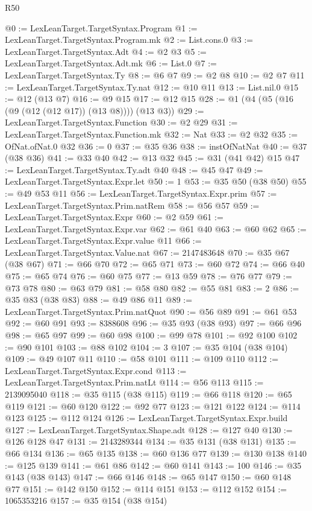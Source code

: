 \begin{lexlean}{R50}
\begin{coremodule}
@0 := LexLeanTarget.TargetSyntax.Program
@1 := LexLeanTarget.TargetSyntax.Program.mk
@2 := List.cons.{0}
@3 := LexLeanTarget.TargetSyntax.Adt
@4 := @2 @3
@5 := LexLeanTarget.TargetSyntax.Adt.mk
@6 := List.{0}
@7 := LexLeanTarget.TargetSyntax.Ty
@8 := @6 @7
@9 := @2 @8
@10 := @2 @7
@11 := LexLeanTarget.TargetSyntax.Ty.nat
@12 := @10 @11
@13 := List.nil.{0}
@15 := @12 (@13 @7)
@16 := @9 @15
@17 := @12 @15
@28 := @1 (@4 (@5 (@16 (@9 (@12 (@12 @17)) (@13 @8)))) (@13 @3))
@29 := LexLeanTarget.TargetSyntax.Function
@30 := @2 @29
@31 := LexLeanTarget.TargetSyntax.Function.mk
@32 := Nat
@33 := @2 @32
@35 := OfNat.ofNat.{0} @32
@36 := 0
@37 := @35 @36
@38 := instOfNatNat
@40 := @37 (@38 @36)
@41 := @33 @40
@42 := @13 @32
@45 := @31 (@41 @42) @15
@47 := LexLeanTarget.TargetSyntax.Ty.adt @40
@48 := @45 @47
@49 := LexLeanTarget.TargetSyntax.Expr.let
@50 := 1
@53 := @35 @50 (@38 @50)
@55 := @49 @53 @11
@56 := LexLeanTarget.TargetSyntax.Expr.prim
@57 := LexLeanTarget.TargetSyntax.Prim.natRem
@58 := @56 @57
@59 := LexLeanTarget.TargetSyntax.Expr
@60 := @2 @59
@61 := LexLeanTarget.TargetSyntax.Expr.var
@62 := @61 @40
@63 := @60 @62
@65 := LexLeanTarget.TargetSyntax.Expr.value @11
@66 := LexLeanTarget.TargetSyntax.Value.nat
@67 := 2147483648
@70 := @35 @67 (@38 @67)
@71 := @66 @70
@72 := @65 @71
@73 := @60 @72
@74 := @66 @40
@75 := @65 @74
@76 := @60 @75
@77 := @13 @59
@78 := @76 @77
@79 := @73 @78
@80 := @63 @79
@81 := @58 @80
@82 := @55 @81
@83 := 2
@86 := @35 @83 (@38 @83)
@88 := @49 @86 @11
@89 := LexLeanTarget.TargetSyntax.Prim.natQuot
@90 := @56 @89
@91 := @61 @53
@92 := @60 @91
@93 := 8388608
@96 := @35 @93 (@38 @93)
@97 := @66 @96
@98 := @65 @97
@99 := @60 @98
@100 := @99 @78
@101 := @92 @100
@102 := @90 @101
@103 := @88 @102
@104 := 3
@107 := @35 @104 (@38 @104)
@109 := @49 @107 @11
@110 := @58 @101
@111 := @109 @110
@112 := LexLeanTarget.TargetSyntax.Expr.cond
@113 := LexLeanTarget.TargetSyntax.Prim.natLt
@114 := @56 @113
@115 := 2139095040
@118 := @35 @115 (@38 @115)
@119 := @66 @118
@120 := @65 @119
@121 := @60 @120
@122 := @92 @77
@123 := @121 @122
@124 := @114 @123
@125 := @112 @124
@126 := LexLeanTarget.TargetSyntax.Expr.build
@127 := LexLeanTarget.TargetSyntax.Shape.adt
@128 := @127 @40
@130 := @126 @128 @47
@131 := 2143289344
@134 := @35 @131 (@38 @131)
@135 := @66 @134
@136 := @65 @135
@138 := @60 @136 @77
@139 := @130 @138
@140 := @125 @139
@141 := @61 @86
@142 := @60 @141
@143 := 100
@146 := @35 @143 (@38 @143)
@147 := @66 @146
@148 := @65 @147
@150 := @60 @148 @77
@151 := @142 @150
@152 := @114 @151
@153 := @112 @152
@154 := 1065353216
@157 := @35 @154 (@38 @154)

\end{coremodule}
\end{lexlean}
